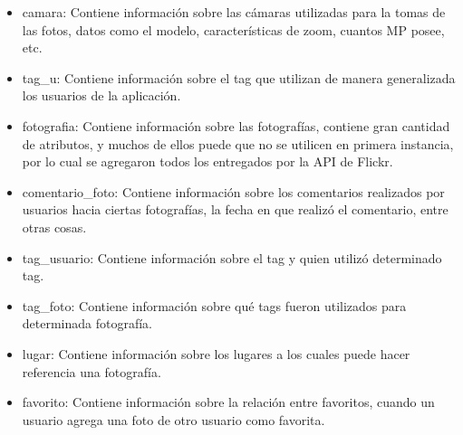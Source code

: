 \documentclass{memoria}
\begin{document}
\begin{itemize}
	\item camara: Contiene información sobre las cámaras utilizadas para la tomas de las fotos, datos como el modelo, características de zoom, cuantos MP posee, etc.
	\item tag\_u: Contiene información sobre el tag que utilizan de manera generalizada los usuarios de la aplicación.
	\item fotografia: Contiene información sobre las fotografías, contiene gran cantidad de atributos, y muchos de ellos puede que no se utilicen en primera instancia, por lo cual se agregaron todos los entregados por la API de Flickr.
	\item comentario\_foto: Contiene información sobre los comentarios realizados por usuarios hacia ciertas fotografías, la fecha en que realizó el comentario, entre otras cosas. 
	\item tag\_usuario: Contiene información sobre el tag y quien utilizó determinado tag.
	\item tag\_foto: Contiene información sobre qué tags fueron utilizados para determinada fotografía.
	\item lugar: Contiene información sobre los lugares a los cuales puede hacer referencia una fotografía.
	\item favorito: Contiene información sobre la relación entre favoritos, cuando un usuario agrega una foto de otro usuario como favorita.
\end{itemize}

\newpage


\end{document}
